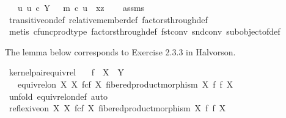 \begin{isabellebody}
\ \ \ {\isachardoublequoteopen}{\isasymexists}u{\isachardot}{\kern0pt}\ u\ {\isasymin}\isactrlsub c\ Y\ {\isasymand}\ \ m\ {\isasymcirc}\isactrlsub c\ u\ {\isacharequal}{\kern0pt}\ {\isasymlangle}x{\isacharcomma}{\kern0pt}z{\isasymrangle}{\isachardoublequoteclose}\isanewline
%
\isadelimproof
\ \ %
\endisadelimproof
%
\isatagproof
{}\isamarkupfalse%
\ assms\ \isamarkupfalse%
\ transitive{\isacharunderscore}{\kern0pt}on{\isacharunderscore}{\kern0pt}def\ relative{\isacharunderscore}{\kern0pt}member{\isacharunderscore}{\kern0pt}def\ factors{\isacharunderscore}{\kern0pt}through{\isacharunderscore}{\kern0pt}def{}\isanewline
\ \ \isamarkupfalse%
\ {\isacharparenleft}{\kern0pt}metis\ cfunc{\isacharunderscore}{\kern0pt}prod{\isacharunderscore}{\kern0pt}type\ factors{\isacharunderscore}{\kern0pt}through{\isacharunderscore}{\kern0pt}def{}\ fst{\isacharunderscore}{\kern0pt}conv\ snd{\isacharunderscore}{\kern0pt}conv\ subobject{\isacharunderscore}{\kern0pt}of{\isacharunderscore}{\kern0pt}def{}{\isacharparenright}{\kern0pt}%
\endisatagproof
{\isafoldproof}%
%
\isadelimproof
%
\endisadelimproof
%
\begin{isamarkuptext}%
The lemma below corresponds to Exercise 2.3.3 in Halvorson.%
\end{isamarkuptext}\isamarkuptrue%
\isamarkupfalse%
\ kernel{\isacharunderscore}{\kern0pt}pair{\isacharunderscore}{\kern0pt}equiv{\isacharunderscore}{\kern0pt}rel{\isacharcolon}{\kern0pt}\isanewline
\ \ \ {\isachardoublequoteopen}f\ {\isacharcolon}{\kern0pt}\ X\ {\isasymrightarrow}\ Y{\isachardoublequoteclose}\isanewline
\ \ \ {\isachardoublequoteopen}equiv{\isacharunderscore}{\kern0pt}rel{\isacharunderscore}{\kern0pt}on\ X\ {\isacharparenleft}{\kern0pt}X\ \isactrlbsub f\isactrlesub {\isasymtimes}\isactrlsub c\isactrlbsub f\isactrlesub \ X{\isacharcomma}{\kern0pt}\ fibered{\isacharunderscore}{\kern0pt}product{\isacharunderscore}{\kern0pt}morphism\ X\ f\ f\ X{\isacharparenright}{\kern0pt}{\isachardoublequoteclose}\isanewline
%
\isadelimproof
%
\endisadelimproof
%
\isatagproof
{}\isamarkupfalse%
\ {\isacharparenleft}{\kern0pt}unfold\ equiv{\isacharunderscore}{\kern0pt}rel{\isacharunderscore}{\kern0pt}on{\isacharunderscore}{\kern0pt}def{\isacharcomma}{\kern0pt}\ auto{\isacharparenright}{\kern0pt}\isanewline
\ \ \isamarkupfalse%
\ {\isachardoublequoteopen}reflexive{\isacharunderscore}{\kern0pt}on\ X\ {\isacharparenleft}{\kern0pt}X\ \isactrlbsub f\isactrlesub {\isasymtimes}\isactrlsub c\isactrlbsub f\isactrlesub \ X{\isacharcomma}{\kern0pt}\ fibered{\isacharunderscore}{\kern0pt}product{\isacharunderscore}{\kern0pt}morphism\ X\ f\ f\ X{\isacharparenright}{\kern0pt}{\isachardoublequoteclose}\isanewline

\end{isabellebody}
